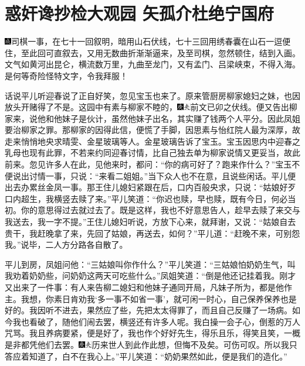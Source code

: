 \chapter{惑奸谗抄检大观园 矢孤介杜绝宁国府}
{\includegraphics[width=3mm]{../Images/00005}\kaishu 司棋一事，在七十一回叙明，暗用山石伏线，七十三回用绣春囊在山石一逗便住，至此回可直叙去，又用无数曲折渐渐逼来，及至司棋，忽然顿住，结到入画。文气如黄河出昆仑，横流数万里，九曲至龙门，又有孟门、吕梁峡束，不得入海。是何等奇险怪特文字，令我拜服！}

话说平儿听迎春说了正自好笑，忽见宝玉也来了。原来管厨房柳家媳妇之妹，也因放头开赌得了不是。这园中有素与柳家不睦的，{\includegraphics[width=3mm]{../Images/00004}\includegraphics[width=3mm]{../Images/00012}\footnotesize \kaishu 前文已卯之伏线。}便又告出柳家来，说他和他妹子是伙计，虽然他妹子出名，其实赚了钱两个人平分。因此凤姐要治柳家之罪。那柳家的因得此信，便慌了手脚，因思素与怡红院人最为深厚，故走来悄悄地央求晴雯、金星玻璃等人。金星玻璃告诉了宝玉。宝玉因思内中迎春之乳母也现有此罪，不若来约同迎春讨情，比自己独去单为柳家说情又更妥当，故此前来。忽见许多人在此，见他来时，都问：``你的病可好了？跑来作什么？''宝玉不便说出讨情一事，只说：``来看二姐姐。''当下众人也不在意，且说些闲话。平儿便出去办累丝金凤一事。那王住儿媳妇紧跟在后，口内百般央求，只说：``姑娘好歹口内超生，我横竖去赎了来。''平儿笑道：``你迟也赎，早也赎，既有今日，何必当初。你的意思得过去就过去了。既是这样，我也不好意思告人，趁早去赎了来交与我送去，我一字不提。''王住儿媳妇听说，方放下心来，就拜谢，又说：``姑娘自去贵干，我赶晚拿了来，先回了姑娘，再送去，如何？''平儿道：``赶晚不来，可别怨我。''说毕，二人方分路各自散了。

平儿到房，凤姐问他：``三姑娘叫你作什么？''平儿笑道：``三姑娘怕奶奶生气，叫我劝着奶奶些，问奶奶这两天可吃些什么。''凤姐笑道：``倒是他还记挂着我。刚才又出来了一件事：有人来告柳二媳妇和他妹子通同开局，凡妹子所为，都是他作主。我想，你素日肯劝我`多一事不如省一事'，就可闲一时心，自己保养保养也是好的。我因听不进去，果然应了些，先把太太得罪了，而且自己反赚了一场病。如今我也看破了，随他们闹去罢，横竖还有许多人呢。我白操一会子心，倒惹的万人咒骂。我且养病要紧，便是好了，我也作个好好先生，得乐且乐，得笑且笑，一概是非都凭他们去罢。{\includegraphics[width=3mm]{../Images/00004}\includegraphics[width=3mm]{../Images/00012}\footnotesize \kaishu 历来世人到此作此想，但悔不及矣。可伤可叹。}所以我只答应着知道了，白不在我心上。''平儿笑道：``奶奶果然如此，便是我们的造化。''

